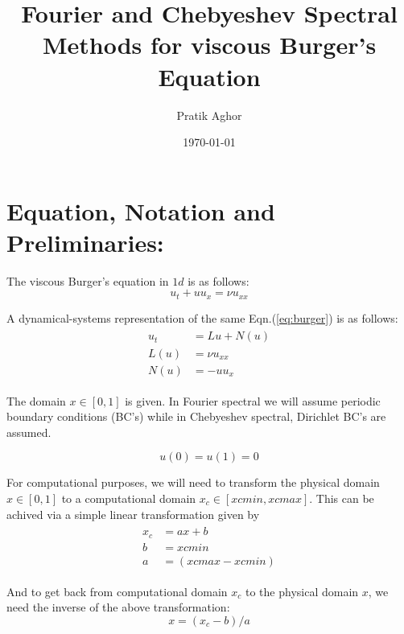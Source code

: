 \documentclass{article}
\author{Pratik Aghor}
\title{Fourier and Chebyeshev Spectral Methods for viscous Burger's Equation}
\date{\today}  %
\begin{document}
\maketitle
\section{Equation, Notation and Preliminaries:}
The viscous Burger's equation in $1d$ is as follows:
\begin{equation}\label{eq:burger}
 u_{t} + uu_{x} =  \nu u_{xx}
\end{equation}

A dynamical-systems representation of the same Eqn.(\ref{eq:burger}) is as follows:
\begin{align}\label{eq:burger_abstract}
\begin{split}
 u_{t}  &=  Lu + N(u)\\
 L(u)   &= \nu u_{xx}\\
 N(u)   &= -uu_{x}
\end{split}
\end{align}

The domain $x\in[0, 1]$ is given. In Fourier spectral we will assume periodic boundary conditions (BC's) while in Chebyeshev spectral, Dirichlet BC's are assumed. 

\begin{equation}\label{eq:Dirichlet_BC}
 u(0) = u(1) = 0
\end{equation}


For computational purposes, we will need to transform the physical domain $x \in [0, 1]$ to a computational domain $x_{c} \in [xcmin, xcmax]$. This can be achived via a simple linear transformation given by
\begin{align}\label{eq:x2xc}
 \begin{split}
  x_{c} &= ax + b\\
  b     &= xcmin\\
  a     &= (xcmax-xcmin)
 \end{split}
\end{align}

And to get back from computational domain $x_{c}$ to the physical domain $x$, we need  the inverse of the above transformation:
\begin{equation}\label{eq:xc2x}
 x = (x_{c}-b)/a
\end{equation}
\end{document}
